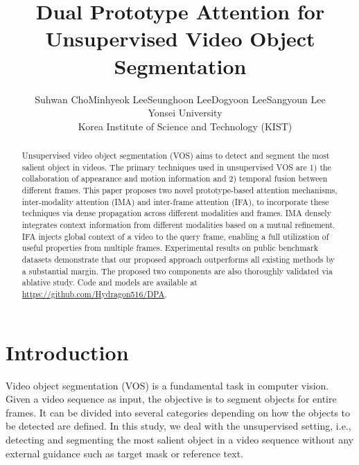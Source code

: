 \documentclass[10pt,twocolumn,letterpaper]{article}
\begin{document}
\title{Dual Prototype Attention for Unsupervised Video Object Segmentation}
\author{Suhwan Cho\quad Minhyeok Lee\quad Seunghoon Lee\quad Dogyoon Lee\quad Sangyoun Lee\vspace{0.5cm}\\
~~Yonsei University\\
~~Korea Institute of Science and Technology (KIST)}


\maketitle
\def\thefootnote{*}




\begin{abstract}
Unsupervised video object segmentation (VOS) aims to detect and segment the most salient object in videos. The primary techniques used in unsupervised VOS are 1) the collaboration of appearance and motion information and 2) temporal fusion between different frames. This paper proposes two novel prototype-based attention mechanisms, inter-modality attention (IMA) and inter-frame attention (IFA), to incorporate these techniques via dense propagation across different modalities and frames. IMA densely integrates context information from different modalities based on a mutual refinement. IFA injects global context of a video to the query frame, enabling a full utilization of useful properties from multiple frames. Experimental results on public benchmark datasets demonstrate that our proposed approach outperforms all existing methods by a substantial margin. The proposed two components are also thoroughly validated via ablative study. Code and models are available at \url{https://github.com/Hydragon516/DPA}.
\end{abstract}



\section{Introduction}
Video object segmentation (VOS) is a fundamental task in computer vision. Given a video sequence as input, the objective is to segment objects for entire frames. It can be divided into several categories depending on how the objects to be detected are defined. In this study, we deal with the unsupervised setting, i.e., detecting and segmenting the most salient object in a video sequence without any external guidance such as target mask or reference text.
\end{document}
